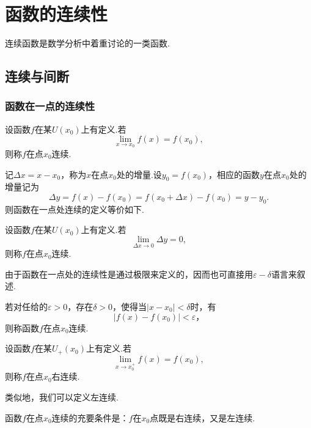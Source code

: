 \chapter{函数的连续性}
连续函数是数学分析中着重讨论的一类函数.
\section{连续与间断}
\subsection{函数在一点的连续性}
\begin{definition}
	设函数$f$在某$U(x_0)$上有定义.若
	$$\lim\limits_{x\to x_0}f(x)=f(x_0),$$
	则称$f${\heiti 在点$x_0$连续}.
\end{definition}
记$\Delta x=x-x_0$，称为$x$在点$x_0$处的增量.设$y_0=f(x_0)$，相应的函数$y$在点$x_0$处的增量记为
$$\Delta y=f(x)-f(x_0)=f(x_0+\Delta x)-f(x_0)=y-y_0.$$
则函数在一点处连续的定义等价如下.
\begin{definition}
	设函数$f$在某$U(x_0)$上有定义.若
	$$\lim\limits_{\Delta x\to 0}\Delta y=0,$$
	则称$f${\heiti 在点$x_0$连续}.
\end{definition}
由于函数在一点处的连续性是通过极限来定义的，因而也可直接用$\varepsilon-\delta$语言来叙述.
\begin{definition}
	若对任给的$\varepsilon>0$，存在$\delta>0$，使得当$|x-x_0|<\delta$时，有
	$$|f(x)-f(x_0)|<\varepsilon，$$
	则称函数$f$在点$x_0$连续.
\end{definition}
\begin{definition}
	设函数$f$在某$U_+(x_0)$上有定义.若
	$$\lim\limits_{x\to x_0^+}f(x)=f(x_0),$$
	则称$f$在点$x_0${\heiti 右连续}.
	
	类似地，我们可以定义左连续.
\end{definition}
\begin{theorem}
	函数$f$在点$x_0$连续的充要条件是：$f$在$x_0$点既是右连续，又是左连续.
\end{theorem}

